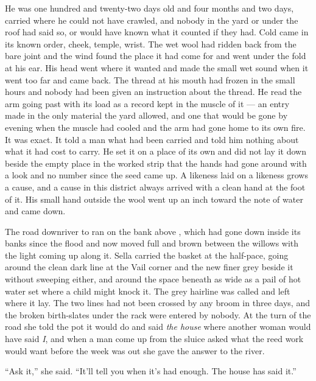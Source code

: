 He was one hundred and twenty-two days old and four months and two days, carried where he could not have crawled, and nobody in the yard or under the roof had said so, or would have known what it counted if they had. Cold came in its known order, cheek, temple, wrist. The wet wool had ridden back from the bare joint and the wind found the place it had come for and went under the fold at his ear. His head went where it wanted and made the small wet sound when it went too far and came back. The thread at his mouth had frozen in the small hours and nobody had been given an instruction about the thread. He read the arm going past with its load as a record kept in the muscle of it --- an entry made in the only material the yard allowed, and one that would be gone by evening when the muscle had cooled and the arm had gone home to its own fire. It was exact. It told a man what had been carried and told him nothing about what it had cost to carry. He set it on a place of its own and did not lay it down beside the empty place in the worked strip that the hands had gone around with a look and no number since the seed came up. A likeness laid on a likeness grows a cause, and a cause in this district always arrived with a clean hand at the foot of it. His small hand outside the wool went up an inch toward the note of water and came down.

\scenebreak

The road downriver to  ran on the bank above , which had gone down inside its banks since the flood and now moved full and brown between the willows with the light coming up along it. Sella carried the basket at the half-pace, going around the clean dark line at the Vail corner and the new finer grey beside it without sweeping either, and around the space beneath  as wide as a pail of hot water set where a child might knock it. The grey hairline was called  and left where it lay. The two lines had not been crossed by any broom in three days, and the broken birth-slates under the rack were entered by nobody. At the turn of the road she told the pot it would do and said \emph{the house} where another woman would have said \emph{I}, and when a man come up from the sluice asked what the reed work would want before the week was out she gave the answer to the river.

“Ask it,” she said. “It'll tell you when it's had enough. The house has said it.”

